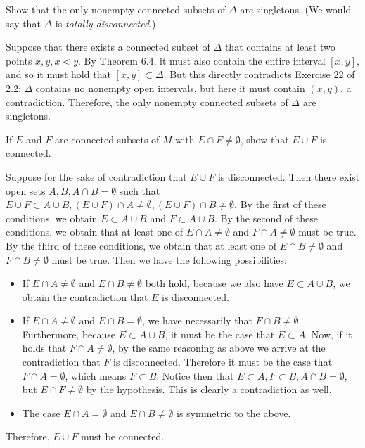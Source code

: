 \begin{exercise}{2}
    Show that the only nonempty connected subsets of $\Delta$ are singletons. (We would say that $\Delta$ is \textit{totally disconnected}.)
\end{exercise}

\begin{solution}
    
    Suppose that there exists a connected subset of $\Delta$ that contains at least two points $x, y, x < y$.
    By Theorem 6.4, it must also contain the entire interval $[x, y]$, and so it must hold that $[x, y] \subset \Delta$.
    But this directly contradicts Exercise 22 of 2.2: $\Delta$ contains no nonempty open intervals, but here it must contain $(x, y)$, a contradiction.
    Therefore, the only nonempty connected subsets of $\Delta$ are singletons.
\end{solution}

\begin{exercise}{5}
    If $E$ and $F$ are connected subsets of $M$ with $E \cap F \neq \emptyset$, show that $E \cup F$ is connected.
\end{exercise}

\begin{solution}
    
    Suppose for the sake of contradiction that $E \cup F$ is disconnected.
    Then there exist open sets $A, B, A \cap B = \emptyset$ such that $E \cup F \subset A \cup B, (E \cup F) \cap A \neq \emptyset, (E \cup F) \cap B \neq \emptyset$.
    By the first of these conditions, we obtain $E \subset A \cup B$ and $F \subset A \cup B$.
    By the second of these conditions, we obtain that at least one of $E \cap A \neq \emptyset$ and $F \cap A \neq \emptyset$ must be true.
    By the third of these conditions, we obtain that at least one of $E \cap B \neq \emptyset$ and $F \cap B \neq \emptyset$ must be true.
    Then we have the following possibilities:
    \begin{itemize}
        \item If $E \cap A \neq \emptyset$ and $E \cap B \neq \emptyset$ both hold, because we also have $E \subset A \cup B$, we obtain the contradiction that $E$ is disconnected.
        \item If $E \cap A \neq \emptyset$ and $E \cap B = \emptyset$, we have necessarily that $F \cap B \neq \emptyset$.
        Furthermore, because $E \subset A \cup B$, it must be the case that $E \subset A$.
        Now, if it holds that $F \cap A \neq \emptyset$, by the same reasoning as above we arrive at the contradiction that $F$ is disconnected.
        Therefore it must be the case that $F \cap A = \emptyset$, which means $F \subset B$.
        Notice then that $E \subset A, F \subset B, A \cap B = \emptyset$, but $E \cap F \neq \emptyset$ by the hypothesis.
        This is clearly a contradiction as well.
        \item The case $E \cap A = \emptyset$ and $E \cap B \neq \emptyset$ is symmetric to the above.
    \end{itemize}
    Therefore, $E \cup F$ must be connected.
\end{solution}

